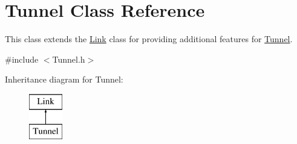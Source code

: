 \hypertarget{classTunnel}{\section{\-Tunnel \-Class \-Reference}
\label{classTunnel}
}


\-This class extends the \hyperlink{classLink}{\-Link} class for providing additional features for \hyperlink{classTunnel}{\-Tunnel}.  




{\ttfamily \#include $<$\-Tunnel.\-h$>$}

\-Inheritance diagram for \-Tunnel\-:\begin{figure}[H]
\begin{center}
\leavevmode
\includegraphics[height=2.000000cm]{classTunnel}
\end{center}
\end{figure}
